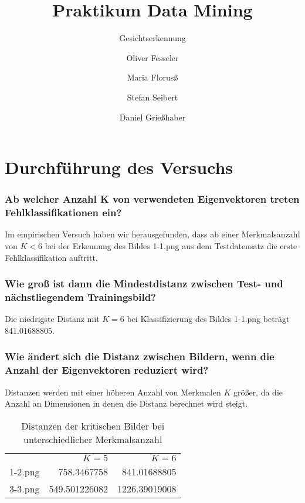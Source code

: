 \documentclass[12pt,a4paper]{scrartcl}
\begin{document}
\title{Praktikum Data Mining}
\subtitle{Gesichtserkennung}
\author{Oliver Fesseler \and Maria Florus\ss \and Stefan Seibert \and  Daniel Grie\ss haber}
\maketitle
\newpage

\part*{Durchf\"uhrung des Versuchs}

\section*{Ab welcher Anzahl K von verwendeten Eigenvektoren treten Fehlklassifikationen ein?}
Im empirischen Versuch haben wir herausgefunden, dass ab einer Merkmalsanzahl von $K < 6$ bei der Erkennung des Bildes 1-1.png aus dem Testdatensatz die erste Fehlklassifikation auftritt.

\section*{Wie gro{\ss} ist dann die Mindestdistanz zwischen Test- und nächstliegendem Trainingsbild?}
Die niedrigste Distanz mit $K=6$ bei Klassifizierung des Bildes 1-1.png beträgt $841.01688805$.

\section*{Wie ändert sich die Distanz zwischen Bildern, wenn die Anzahl der Eigenvektoren reduziert wird?}

Distanzen werden mit einer höheren Anzahl von Merkmalen $K$ größer, da die Anzahl an Dimensionen in denen die Distanz berechnet wird steigt.

 \begin{table}[h!]

 \centering
 
 \begin{tabular}{l r r}
 & $K=5$ & $K=6$ \\
 1-2.png & 758.3467758 & 841.01688805 \\
 3-3.png & 549.501226082 & 1226.39019008 \\
 \end{tabular}
 \caption*{Distanzen der kritischen Bilder bei unterschiedlicher Merkmalsanzahl}
 \end{table} 
\end{document}

